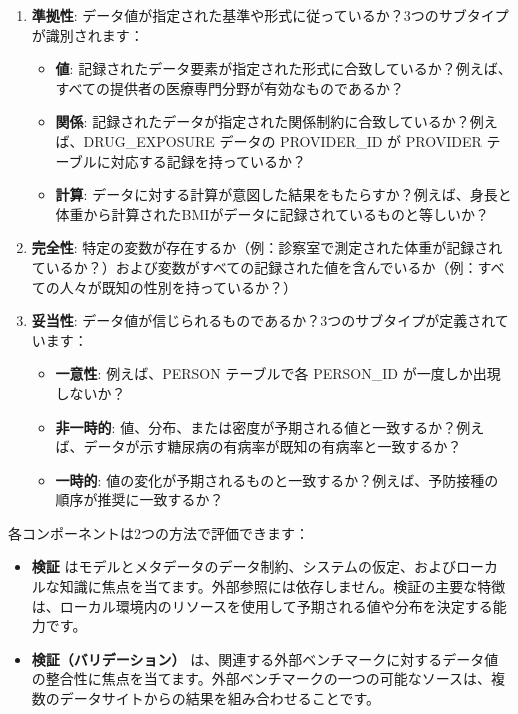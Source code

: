 \documentclass[
  11pt]{book}
\providecommand{\tightlist}{%
  \setlength{\itemsep}{0pt}\setlength{\parskip}{0pt}}
\theoremstyle{definition}
\theoremstyle{definition}
\theoremstyle{definition}
\theoremstyle{definition}
\theoremstyle{remark}
\begin{document}
\begin{enumerate}
\def\labelenumi{\arabic{enumi}.}
\tightlist
\item
  \textbf{準拠性}: データ値が指定された基準や形式に従っているか？3つのサブタイプが識別されます：

  \begin{itemize}
  \tightlist
  \item
    \textbf{値}: 記録されたデータ要素が指定された形式に合致しているか？例えば、すべての提供者の医療専門分野が有効なものであるか？
  \item
    \textbf{関係}: 記録されたデータが指定された関係制約に合致しているか？例えば、DRUG\_EXPOSURE データの PROVIDER\_ID が PROVIDER テーブルに対応する記録を持っているか？
  \item
    \textbf{計算}: データに対する計算が意図した結果をもたらすか？例えば、身長と体重から計算されたBMIがデータに記録されているものと等しいか？
  \end{itemize}
\item
  \textbf{完全性}: 特定の変数が存在するか（例：診察室で測定された体重が記録されているか？）および変数がすべての記録された値を含んでいるか（例：すべての人々が既知の性別を持っているか？）
\item
  \textbf{妥当性}: データ値が信じられるものであるか？3つのサブタイプが定義されています：

  \begin{itemize}
  \tightlist
  \item
    \textbf{一意性}: 例えば、PERSON テーブルで各 PERSON\_ID が一度しか出現しないか？
  \item
    \textbf{非一時的}: 値、分布、または密度が予期される値と一致するか？例えば、データが示す糖尿病の有病率が既知の有病率と一致するか？
  \item
    \textbf{一時的}: 値の変化が予期されるものと一致するか？例えば、予防接種の順序が推奨に一致するか？
  \end{itemize}

    
\end{enumerate}

各コンポーネントは2つの方法で評価できます：

\begin{itemize}
\tightlist
\item
  \textbf{検証} はモデルとメタデータのデータ制約、システムの仮定、およびローカルな知識に焦点を当てます。外部参照には依存しません。検証の主要な特徴は、ローカル環境内のリソースを使用して予期される値や分布を決定する能力です。
\item
  \textbf{検証（バリデーション）} は、関連する外部ベンチマークに対するデータ値の整合性に焦点を当てます。外部ベンチマークの一つの可能なソースは、複数のデータサイトからの結果を組み合わせることです。
\end{itemize}
\end{document}
